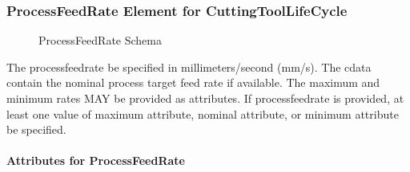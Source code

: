 \documentclass{mtconnect}	%
\begin{document}
\clearpage

\subsubsection{ProcessFeedRate Element for CuttingToolLifeCycle}

\begin{figure}[ht]
  \centering
  \caption{ProcessFeedRate Schema}
  \label{fig:processfeedrate-schema}
\end{figure}

\FloatBarrier

The \gls{processfeedrate} \MUST be specified in millimeters/second (mm/s).  The \gls{cdata} \MAY contain the nominal process target feed rate if available.  The maximum and minimum rates MAY be provided as attributes.  If \gls{processfeedrate} is provided, at least one value of \gls{maximum attribute}, \gls{nominal attribute}, or \gls{minimum attribute} \MUST be specified.

\paragraph{Attributes for ProcessFeedRate}\mbox{}
\end{document}
